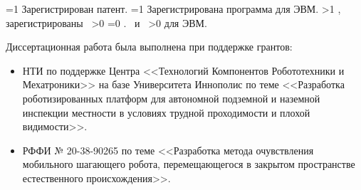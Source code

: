 {\begin{refsection}
        \ifnum \value{citeauthorpatent}=1%
            Зарегистрирован  патент.
        \fi%
        \ifnum \value{citeauthorprogram}=1%
            Зарегистрирована  программа для ЭВМ.
        \fi%
    \fi%
    \ifnum \value{citeregistered}>1%
        , зарегистрированы\ %
        \ifnum \value{citeauthorpatent}>0%
        \sloppy%
        \ifnum \value{citeauthorprogram}=0 . \else \ и~\fi%
        \fi%
        \ifnum \value{citeauthorprogram}>0%
         для ЭВМ.
        \fi%
    \fi%
\end{refsection}%
}

Диссертационная работа была выполнена при поддержке грантов:
\begin{itemize}
    \item НТИ по поддержке Центра <<Технологий Компонентов Робототехники и Мехатроники>> на базе Университета Иннополис по теме <<Разработка роботизированных платформ для автономной подземной и наземной инспекции местности в условиях трудной проходимости и плохой видимости>>. 
    \item РФФИ № 20-38-90265 по теме <<Разработка метода очувствления мобильного шагающего робота, перемещающегося в закрытом пространстве естественного происхождения>>.
\end{itemize}


